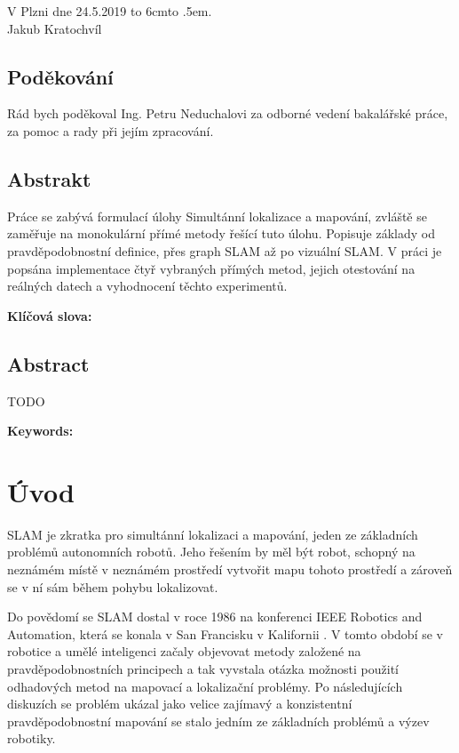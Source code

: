 \documentclass[12pt,a4paper]{article}
\def\dotfill#1{\cleaders\hbox to #1{.}\hfill}
\newcommand\dotline[2][.5em]{\leavevmode\hbox to #2{\dotfill{#1}\hfil}}
\begin{document}
\vspace{2cm}
\noindent
V Plzni dne 24.5.2019 \hfill \dotline{6cm} \\

\hspace*{10.7cm} Jakub Kratochvíl

\vspace{6cm}

\subsection*{Poděkování}

Rád bych poděkoval Ing. Petru Neduchalovi za odborné vedení bakalářské práce, za pomoc a rady při jejím zpracování.

\newpage
\subsection*{Abstrakt}
Práce se zabývá formulací úlohy Simultánní lokalizace a mapování, zvláště se zaměřuje na monokulární přímé metody řešící tuto úlohu. Popisuje základy od pravděpodobnostní definice, přes graph SLAM až po vizuální SLAM. V práci je popsána implementace čtyř vybraných přímých metod, jejich otestování na reálných datech a vyhodnocení těchto experimentů. 

\noindent
\textbf{Klíčová slova:} 

\subsection*{Abstract}
TODO

\textbf{Keywords:}

\newpage
\tableofcontents
\newpage
\fontsize{12pt}{18pt}\selectfont


\section{Úvod}
SLAM je zkratka pro simultánní lokalizaci a mapování, jeden ze základních problémů autonomních robotů. Jeho řešením by měl být robot, schopný na neznámém místě v neznámém prostředí vytvořit mapu tohoto prostředí a zároveň se v ní sám během pohybu lokalizovat.

Do povědomí se SLAM dostal v roce 1986 na konferenci IEEE Robotics and Automation, která se konala v San Francisku v Kalifornii \cite{Durrant-Whyte}. V tomto období se v robotice a umělé inteligenci začaly objevovat metody založené na pravděpodobnostních principech a tak vyvstala otázka možnosti použití odhadových metod na mapovací a lokalizační problémy. Po následujících diskuzích se problém ukázal jako velice zajímavý a konzistentní pravděpodobnostní mapování se stalo jedním ze základních problémů a výzev robotiky.
\end{document}
